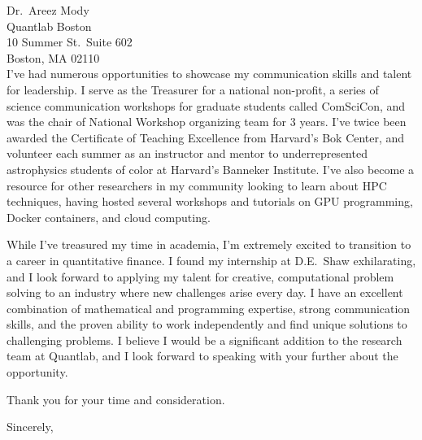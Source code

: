 \documentclass{letter}
\begin{document}
\begin{letter}{Dr.~Areez Mody\\
    Quantlab Boston\\ 10 Summer St.~Suite 602\\ Boston, MA 02110\\ }
\noindent I've had numerous opportunities to showcase my communication skills
and talent for leadership. I serve as the Treasurer for a national
non-profit, a series of science communication workshops for graduate students
called ComSciCon, and was the chair of National Workshop organizing team for 3
years. I've twice been awarded the Certificate of Teaching Excellence from
Harvard's Bok Center, and volunteer each summer as an instructor and mentor to
underrepresented astrophysics students of color at Harvard's Banneker
Institute. I've also become a resource for other researchers in my community
looking to learn about HPC techniques, having hosted several workshops and
tutorials on GPU programming, Docker containers, and cloud computing.

\noindent While I've treasured my time in academia, I'm extremely excited to
transition to a career in quantitative finance. I found my internship at
D.E.~Shaw exhilarating, and I look forward to applying my talent for creative,
computational problem solving to an industry where new challenges arise every
day. I have an excellent combination of mathematical and programming expertise,
strong communication skills, and the proven ability to work independently and
find unique solutions to challenging problems. I believe I would be a
significant addition to the research team at Quantlab, and I look forward to
speaking with your further about the opportunity.

Thank you for your time and consideration.

\closing{Sincerely,}

\end{letter}
\end{document}
